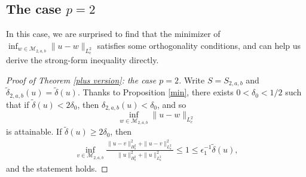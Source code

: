 \documentclass[11pt]{article}
\numberwithin{equation}{section}
\begin{document}
\subsection{The case $p=2$}

In this case, we are surprised to find that the minimizer of $\inf_{w\in \mathcal{M}_{2,a,b}}\|u-w\|_{L^2_c}$ satisfies some orthogonality conditions, and can help us derive the strong-form inequality directly.
\begin{proof}[Proof of Theorem \ref{plus version}: the case $p=2$]
    Write $S=S_{2,a,b}$ and $\tilde{\delta}_{2,a,b}(u)=\tilde{\delta}(u)$. Thanks to Proposition \ref{min}, there exists $0<\delta_0<1/2$ such that if $\tilde{\delta}(u)<2\delta_0$, then $\delta_{2,a,b}(u) < \delta_0$, and so
    \[ \inf_{w\in\mathcal{M}_{2,a,b}} \|u-w\|_{L_c^2} \]
    is attainable. If $\tilde{\delta}(u) \ge 2\delta_0$, then
    \begin{align*}
        \inf_{v\in \mathcal{M}_{2,a,b}}\frac{ \|u-v\|_{H_b^2}^2+\|u-v\|_{L^2_a}^2}{\|u\|_{H^2_b}^2+\|u\|_{L^2_a}^2} \le 1 \le \epsilon_1^{-1}\tilde{\delta}(u),
    \end{align*}
    and the statement holds.


\end{proof}
\end{document}
